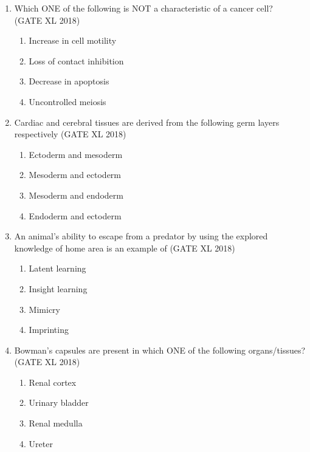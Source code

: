 \documentclass[14pt]{extarticle}
\begin{document}
\begin{flushleft}
\begin{enumerate}
    \item Which ONE of the following is NOT a characteristic of a cancer cell?\\
    \hfill(GATE XL 2018)\\
    \begin{multicols}{2}
    \begin{enumerate}
        \item Increase in cell motility
        \item Loss of contact inhibition
        \item Decrease in apoptosis
        \item Uncontrolled meiosis
    \end{enumerate}
    \end{multicols}

    \item Cardiac and cerebral tissues are derived from the following germ layers respectively \hfill(GATE XL 2018)\\
    \begin{multicols}{2}
    \begin{enumerate}
        \item Ectoderm and mesoderm
        \item Mesoderm and ectoderm
        \item Mesoderm and endoderm
        \item Endoderm and ectoderm
    \end{enumerate}
    \end{multicols}

    \item An animal’s ability to escape from a predator by using the explored knowledge of home area is an example of \hfill(GATE XL 2018)\\
    \begin{multicols}{2}
    \begin{enumerate}
        \item Latent learning
        \item Insight learning
        \item Mimicry
        \item Imprinting
    \end{enumerate}
    \end{multicols}

    \item Bowman's capsules are present in which ONE of the following organs/tissues? \hfill(GATE XL 2018)\\
    \begin{multicols}{2}
    \begin{enumerate}
        \item Renal cortex
        \item Urinary bladder
        \item Renal medulla
        \item Ureter
    \end{enumerate}
    \end{multicols}


\end{enumerate}
\end{flushleft}
\end{document}
